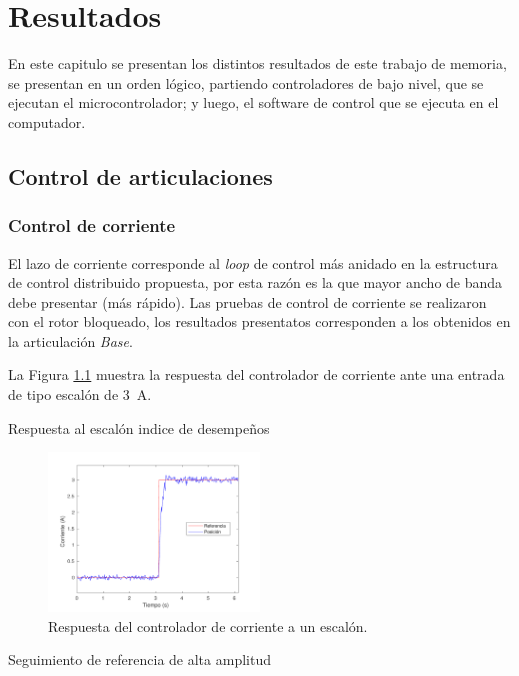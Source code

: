 \chapter{Resultados}

En este capitulo se presentan los distintos resultados de este trabajo de memoria, se presentan en un orden lógico, partiendo controladores de bajo nivel, que se ejecutan el microcontrolador; y luego, el software de control que se ejecuta en el computador.

\section{Control de articulaciones}

\subsection{Control de corriente}

El lazo de corriente corresponde al \textit{loop} de control más anidado en la estructura de control distribuido propuesta, por esta razón es la que mayor ancho de banda debe presentar (más rápido). Las pruebas de control de corriente se realizaron con el rotor bloqueado, los resultados presentatos corresponden a los obtenidos en la articulación \textit{Base}.

La Figura \ref{cap5_step_corriente} muestra la respuesta del controlador de corriente ante una entrada de tipo escalón de \SI{3}{\ampere}.

Respuesta al escalón
indice de desempeños

\begin{figure}[h]
  \centering
  \includegraphics[width=0.5\textwidth]{img/cap5/step_corriente.pdf}
  \caption{Respuesta del controlador de corriente a un escalón.}
  \label{cap5_step_corriente}
\end{figure}

Seguimiento de referencia de alta amplitud

